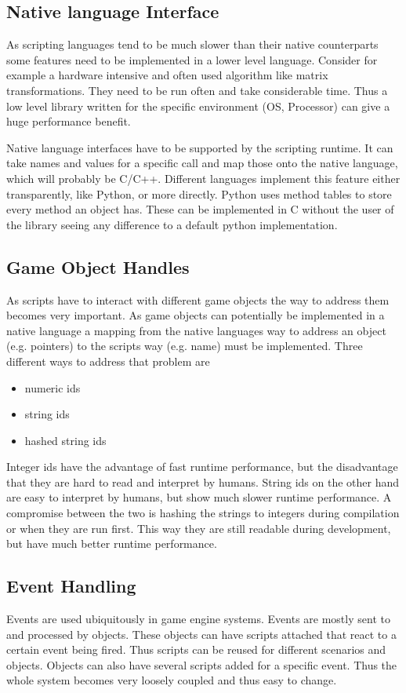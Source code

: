 \documentclass{article}
\begin{document}
\subsection{Native language Interface}
As scripting languages tend to be much slower than their native counterparts
some features need to be implemented in a lower level language. Consider for
example a hardware intensive and often used algorithm like matrix transformations. They
need to be run often and take considerable time. Thus a low level library written
for the specific environment (OS, Processor) can give a huge performance benefit.

Native language interfaces have to be supported by the scripting runtime. It can
take names and values for a specific call and map those onto the native language,
which will probably be C/C++. Different languages implement this feature either
transparently, like Python, or more directly. Python uses method tables to store
every method an object has. These can be implemented in C without the user of the
library seeing any difference to a default python implementation.

\subsection{Game Object Handles}
As scripts have to interact with different game objects the way to address them
becomes very important. As game objects can potentially be implemented in a
native language a mapping from the native languages way to address an object
(e.g. pointers) to the scripts way (e.g. name) must be implemented. Three
different ways to address that problem are
\begin{itemize}
\item numeric ids
\item string ids
\item hashed string ids
\end{itemize}

Integer ids have the advantage of fast runtime performance, but the disadvantage
that they are hard to read and interpret by humans. String ids on the other hand
are easy to interpret by humans, but show much slower runtime performance. A 
compromise between the two is hashing the strings to integers during compilation
or when they are run first. This way they are still readable during development,
but have much better runtime performance.

\subsection{Event Handling} \label{event-handling}
Events are used ubiquitously in game engine systems. Events are mostly sent to and
processed by objects. These objects can have scripts attached that react to a
certain event being fired. Thus scripts can be reused for different scenarios and
objects. Objects can also have several scripts added for a specific event. Thus
the whole system becomes very loosely coupled and thus easy to change.
\end{document}
